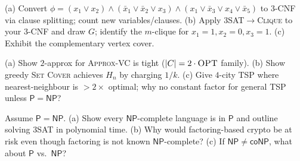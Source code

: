 \begin{exercise}
(a) Convert $\phi=(x_1\vee x_2)\wedge(\bar x_1\vee\bar x_2\vee x_3)\wedge(x_1\vee\bar x_3\vee x_4\vee\bar x_5)$ to 3-CNF via clause splitting; count new variables/clauses. (b) Apply 3SAT$\to$\textsc{Clique} to your 3-CNF and draw $G$; identify the $m$-clique for $x_1=1,x_2=0,x_3=1$. (c) Exhibit the complementary vertex cover.
\end{exercise}

\begin{exercise}
(a) Show $2$-approx for \textsc{Approx-VC} is tight ($|C|=2\cdot\textsc{OPT}$ family). (b) Show greedy \textsc{Set Cover} achieves $H_n$ by charging $1/k$. (c) Give $4$-city TSP where nearest-neighbour is $>2\times$ optimal; why no constant factor for general TSP unless $\mathsf{P}=\mathsf{NP}$?
\end{exercise}

\begin{exercise}
Assume $\mathsf{P}=\mathsf{NP}$. (a) Show every $\mathsf{NP}$-complete language is in $\mathsf{P}$ and outline solving \textsc{3SAT} in polynomial time. (b) Why would factoring-based crypto be at risk even though factoring is not known $\mathsf{NP}$-complete? (c) If $\mathsf{NP}\neq\mathsf{coNP}$, what about $\mathsf{P}$ vs.\ $\mathsf{NP}$?
\end{exercise}
